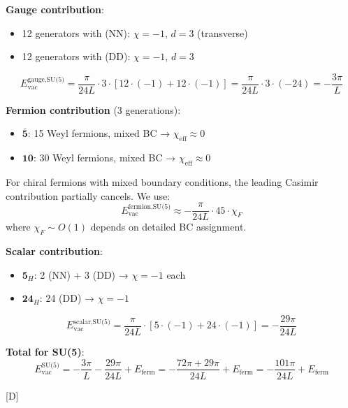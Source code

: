 \documentclass[11pt,a4paper]{article}
\newcommand{\tagD}{\textcolor{blue!70!black}{[D]}}
\begin{document}
\begin{computebox}
\textbf{Gauge contribution}:
\begin{itemize}
    \item 12 generators with (NN): $\chi = -1$, $d = 3$ (transverse)
    \item 12 generators with (DD): $\chi = -1$, $d = 3$
\end{itemize}
\begin{equation}
\label{eq:su5-gauge}
E_{\text{vac}}^{\text{gauge,SU(5)}} = \frac{\pi}{24L} \cdot 3 \cdot [12 \cdot (-1) + 12 \cdot (-1)]
= \frac{\pi}{24L} \cdot 3 \cdot (-24) = -\frac{3\pi}{L}
\end{equation}

\textbf{Fermion contribution} (3 generations):
\begin{itemize}
    \item $\bar{\mathbf{5}}$: 15 Weyl fermions, mixed BC → $\chi_{\text{eff}} \approx 0$
    \item $\mathbf{10}$: 30 Weyl fermions, mixed BC → $\chi_{\text{eff}} \approx 0$
\end{itemize}

For chiral fermions with mixed boundary conditions, the leading Casimir contribution
partially cancels. We use:
\begin{equation}
\label{eq:su5-ferm}
E_{\text{vac}}^{\text{fermion,SU(5)}} \approx -\frac{\pi}{24L} \cdot 45 \cdot \chi_F
\end{equation}
where $\chi_F \sim O(1)$ depends on detailed BC assignment.

\textbf{Scalar contribution}:
\begin{itemize}
    \item $\mathbf{5}_H$: 2 (NN) + 3 (DD) → $\chi = -1$ each
    \item $\mathbf{24}_H$: 24 (DD) → $\chi = -1$
\end{itemize}
\begin{equation}
\label{eq:su5-scalar}
E_{\text{vac}}^{\text{scalar,SU(5)}} = \frac{\pi}{24L} \cdot [5 \cdot (-1) + 24 \cdot (-1)]
= -\frac{29\pi}{24L}
\end{equation}

\textbf{Total for SU(5)}:
\begin{equation}
\label{eq:su5-total}
E_{\text{vac}}^{\text{SU(5)}} = -\frac{3\pi}{L} - \frac{29\pi}{24L} + E_{\text{ferm}}
= -\frac{72\pi + 29\pi}{24L} + E_{\text{ferm}} = -\frac{101\pi}{24L} + E_{\text{ferm}}
\end{equation}

\tagD
\end{computebox}
\end{document}
